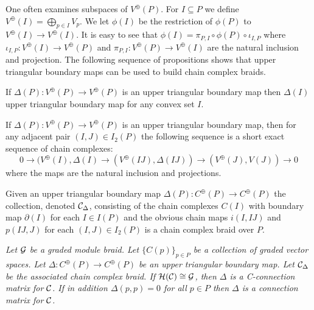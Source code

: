 One often examines subspaces of $V^\oplus(P)$.  For $I\subseteq P$ we define $V^\oplus(I)= \bigoplus_{p\in I} V_p$.  We let $\phi(I)$ be the restriction of $\phi(P)$ to $V^\oplus(I)\to V^\oplus(I)$.  It is easy to see that $\phi(I) = \pi_{P,I} \circ \phi(P) \circ \iota_{I,P}$ where $\iota_{I,P}:V^\oplus(I)\to V^\oplus(P)$ and $\pi_{P,I}:V^\oplus(P)\to V^\oplus(I)$ are the natural inclusion and projection.  The following sequence of propositions shows that upper triangular boundary maps can be used to build chain complex braids.




\begin{prop}
If $\Delta(P):V^\oplus(P)\to V^\oplus(P)$ is an upper triangular boundary map then $\Delta(I)$ upper triangular boundary map for any convex set $I$.   
\end{prop}

\begin{prop}\label{prop:fran:3.3}
If $\Delta(P):V^\oplus(P)\to V^\oplus(P)$ is an upper triangular boundary map, then for any adjacent pair $(I,J)\in I_2(P)$ the following sequence is a short exact sequence of chain complexes: $$0\to (V^\oplus(I),\Delta(I)\to (V^\oplus(IJ),\Delta(IJ))\to (V^\oplus(J),V(J))\to 0$$ where the maps are the natural inclusion and projections.
\end{prop}

\begin{prop}\label{prop:fran:3.4}
Given an upper triangular boundary map $\Delta(P):C^\oplus(P)\to C^\oplus(P)$ the collection, denoted ${\mathcal C}_\Delta$, consisting of the chain complexes $C(I)$ with boundary map $\partial(I)$ for each $I\in I(P)$ and the obvious chain maps $i(I,IJ)$ and $p(IJ,J)$ for each $(I,J)\in I_2(P)$ is a chain complex braid over $P$.
\end{prop}






\begin{defn}
{\em
Let ${\mathcal G}$ be a graded module braid.  Let $\{C(p)\}_{p\in P}$ be a collection of graded vector spaces.  Let $\Delta:C^\oplus(P)\to C^\oplus(P)$ be an upper triangular boundary map.  Let ${\mathcal C}_\Delta$ be the associated chain complex braid.  If ${\mathcal H}({\mathcal C})\cong {\mathcal G}$, then $\Delta$ is a {\em C-connection matrix} for ${\mathcal C}$.  If in addition $\Delta(p,p)=0$ for all $p\in P$ then $\Delta$ is a {\em connection matrix} for ${\mathcal C}$.
}
\end{defn}

